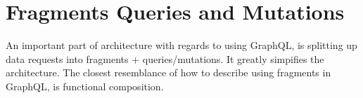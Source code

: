 \maketitle{}
\section{ Fragments Queries and Mutations }

An important part of architecture with regards to using GraphQL, is splitting
up data requests into fragments + queries/mutations. It greatly simpifies
the architecture. The closest resemblance of how to describe using fragments
in GraphQL, is functional composition.

